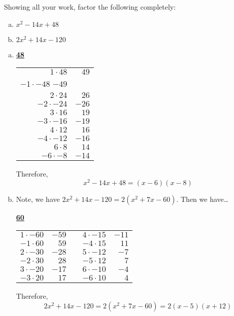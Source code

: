 \documentclass[11pt,letterpaper]{article}
\begin{document}

 Showing all your work, factor the following completely:
	\begin{enumerate}[(a)]
	\item $x^2 - 14x + 48$
	\item $2x^2 + 14x - 120$
	\end{enumerate} \pspace

\sol
\begin{enumerate}[(a)]
\item \phantom{.}\par
	\begin{table}[!ht]
	\centering
	\underline{\bfseries 48} \pvspace{0.2cm}
	\begin{tabular}{rr}
	$1 \cdot 48$ & $49$ \\
	$-1 \cdot -48$ $-49$ \\
	$2 \cdot 24$ & $26$ \\
	$-2 \cdot -24$ & $-26$ \\
	$3 \cdot 16$ & $19$ \\
	$-3 \cdot -16$ & $-19$ \\
	$4 \cdot 12$ & $16$ \\
	$-4 \cdot -12$ & $-16$ \\
	$6 \cdot 8$ & $14$ \\ \hline
	\multicolumn{1}{|r}{$-6 \cdot -8$} & \multicolumn{1}{r|}{$-14$} \\ \hline
	\end{tabular}
	\end{table}

Therefore,
	\[
	x^2 - 14x + 48= (x - 6)(x - 8)
	\] \pspace

\item Note, we have $2x^2 + 14x - 120= 2(x^2 + 7x - 60)$. Then we have\dots
	\begin{table}[!ht]
	\centering
	\underline{\bfseries 60} \pvspace{0.2cm}
	\begin{tabular}{rrrrr}
	$1 \cdot -60$ & $-59$ &\phantom{---}& $4 \cdot -15$ & $-11$ \\
	$-1 \cdot 60$ & $59$ && $-4 \cdot 15$ & $11$ \\
	$2 \cdot -30$ & $-28$ && $5 \cdot -12$ &  $-7$ \\ \cline{4-5}
	$-2 \cdot 30$ & $28$ && \multicolumn{1}{|r}{$-5 \cdot 12$} & \multicolumn{1}{r|}{$7$} \\ \cline{4-5}
	$3 \cdot -20$ & $-17$ && $6 \cdot -10$ & $-4$ \\
	$-3 \cdot 20$ & $17$ && $-6 \cdot 10$ & $4$
	\end{tabular}
	\end{table}

Therefore,
	\[
	2x^2 + 14x - 120= 2(x^2 + 7x - 60)= 2(x- 5)(x + 12)
	\]
\end{enumerate}
\end{document}
